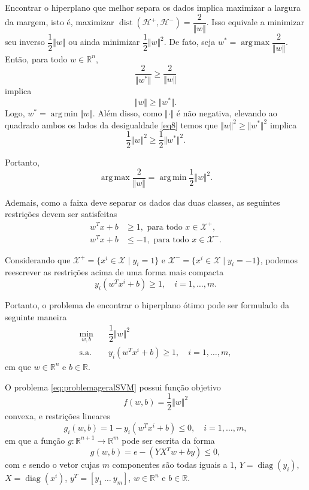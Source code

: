 \documentclass[12pt,a4paper]{scrartcl}
\DeclareMathOperator*{\argmax}{arg\, max}
\DeclareMathOperator*{\argmin}{arg\, min}
\DeclareMathOperator{\diag}{diag}
\DeclareMathOperator{\dist}{dist}
\def\Xset{\mathcal{X}}
\def\Hset{\mathcal{H}}
\def\RR{\mathds{R}}
\theoremstyle{definition}%
\begin{document}
Encontrar o hiperplano que melhor separa os dados implica maximizar a largura da margem, isto é, maximizar $\dist(\Hset^{+} , \Hset^{-}) =\dfrac{2}{\Vert w\Vert }$. Isso equivale a minimizar seu inverso $\dfrac{1}{2}\Vert w\Vert $ ou ainda minimizar $\dfrac{1}{2}\Vert w\Vert^{2}$. De fato, seja $w^{*}=\argmax\dfrac{2}{\Vert w\Vert}$. Então, para todo $w\in \RR^n$,
\[ \dfrac{2}{\Vert w^{*}\Vert} \geq \dfrac{2}{\Vert w\Vert} \]
implica
\[ \label{eq8} \Vert w\Vert \geq \Vert w^{*}\Vert. \]
Logo, $w^{*}=\argmin\Vert w\Vert$. Além disso, como $\Vert \cdot \Vert$ é não negativa, elevando ao quadrado ambos os lados da desigualdade \eqref{eq8} temos que  $\Vert w\Vert^{2} \geq \Vert w^{*}\Vert^{2}$ implica
\[ \dfrac{1}{2}\Vert w\Vert^{2} \geq \dfrac{1}{2}\Vert w^{*}\Vert^{2}. \]

Portanto, 
\[ \argmax\dfrac{2}{\Vert w\Vert} = \argmin\dfrac{1}{2}\Vert w\Vert^2. \]

Ademais, como a faixa deve separar os dados das duas classes, as seguintes restrições devem ser satisfeitas
\begin{align}
w^{T}x+b &\geq 1 , \text{ para  todo } x\in \Xset^{+}, \\
w^{T}x+b &\leq -1 , \text{ para  todo } x\in \Xset^{-}.
\end{align}

Considerando que $\Xset^{+}=\{x^i \in \Xset\mid y_i=1\}$ e $\Xset^{-}=\{x^i \in \Xset \mid y_i=-1\}$, podemos reescrever as restrições acima de uma forma mais compacta 
\[ y_{i}(w^{T}x^{i}+b)\geq 1, \quad i=1, \ldots ,m. \]

Portanto, o problema de encontrar o hiperplano ótimo pode ser formulado da seguinte maneira
\[ \label{eq:problemageralSVM}
\begin{aligned}
\min_{w,b} & \quad \dfrac{1}{2} \Vert w\Vert^{2} \\
\text{s.a.} &  \quad y_i(w^{T}x^{i}+b) \geq 1, \quad i=1, \ldots , m, \end{aligned}
 \]
em que $w\in \RR^{n}$ e $b\in \RR$. 

O problema \eqref{eq:problemageralSVM} possui função objetivo 
\[ f(w,b)=\dfrac{1}{2}\Vert w\Vert^{2} \]
convexa, e restrições lineares
\[ g_i(w,b)=1-y_i(w^{T}x^{i}+b) \leq 0, \quad i=1, \ldots, m, \]
em que a função $g:\RR^{n+1} \rightarrow \RR^{m}$ pode ser escrita da forma 
\[ g(w,b)= e - (YX^{T}w+by) \leq 0, \]
com $e$ sendo o vetor cujas $m$ componentes são todas iguais a $1$, $Y=\diag(y_{i})$, $X=\diag(x^{i})$, $y^{T}=[y_{1} \ \ldots \ y_{m}]$, $w\in \RR^n$ e $b\in \RR$.
\end{document}
